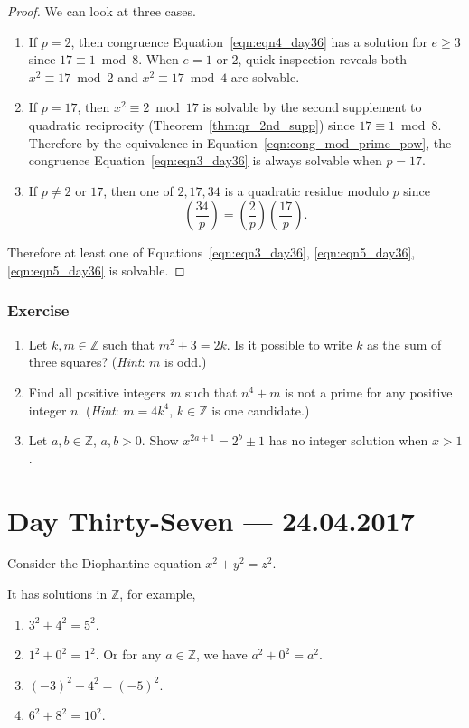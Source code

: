 \documentclass{amsbook}
\theoremstyle{plain}
\theoremstyle{definition}
\theoremstyle{remark}
\numberwithin{equation}{chapter}
\numberwithin{figure}{chapter}
\newcommand{\Z}{\mathbb{Z}}
\begin{document}
\begin{proof}
  We can look at three cases.
  \begin{enumerate}[label=(\roman*)]
  \item If $p = 2$, then congruence Equation~\eqref{eqn:eqn4_day36} has a solution for $e \geqslant 3$ since $17 \equiv 1 \bmod 8$. When $e = 1$ or $2$, quick inspection reveals both $x^2 \equiv 17 \bmod 2$ and $x^2 \equiv 17 \bmod 4$ are solvable.
  \item If $p = 17$, then $x^2 \equiv 2 \bmod 17$ is solvable by the second supplement to quadratic reciprocity (Theorem~\ref{thm:qr_2nd_supp}) since $17 \equiv 1 \bmod 8$. Therefore by the equivalence in Equation~\eqref{eqn:cong_mod_prime_pow}, the congruence Equation~\eqref{eqn:eqn3_day36} is always solvable when $p = 17$.
  \item If $p \neq 2$ or $17$, then one of $2, 17, 34$ is a quadratic residue modulo $p$ since
    \[
      \left(\frac{34}p\right) = \left(\frac{2}p\right) \left(\frac{17}p\right) .
    \]
  \end{enumerate}
Therefore at least one of Equations~\eqref{eqn:eqn3_day36}, \eqref{eqn:eqn5_day36}, \eqref{eqn:eqn5_day36} is solvable. 
\end{proof}

\subsection*{Exercise}
\begin{enumerate}
\item Let $k, m \in \Z$ such that $m^2 + 3 = 2k$. Is it possible to write $k$ as the sum of three squares? (\emph{Hint}: $m$ is odd.) 
\item Find all positive integers $m$ such that $n^4 + m$ is not a prime for any positive integer $n$. (\emph{Hint}: $m = 4k^4$, $k \in \Z$ is one candidate.)
\item Let $a, b \in \Z$, $a, b > 0$. Show $x^{2a+1} = 2^b \pm 1$ has no integer solution when $x > 1$.
\end{enumerate}

\chapter[Lecture Thirty-Seven]{Day Thirty-Seven \hfill {\footnotesize \rm --- 24.04.2017}}

Consider the Diophantine equation $x^2 + y^2 = z^2$.

It has solutions in $\Z$, for example,
\begin{enumerate}[label=(\arabic*)]
\item $3^2 + 4^2 = 5^2$.
\item $1^2 + 0^2 = 1^2$. Or for any $a \in \Z$, we have $a^2 + 0^2 = a^2$.
\item $(-3)^2 + 4^2 = (-5)^2$.
\item $6^2 + 8^2 = {10}^2$.
\end{enumerate}
\end{document}
